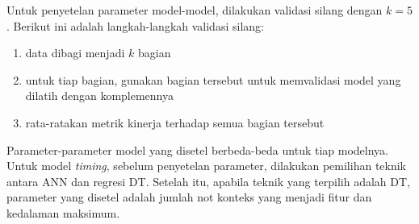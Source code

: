 Untuk penyetelan parameter model-model, dilakukan validasi silang dengan $k=5$. Berikut ini adalah langkah-langkah validasi silang:
\begin{enumerate}
	\item data dibagi menjadi $k$ bagian
	\item untuk tiap bagian, gunakan bagian tersebut untuk memvalidasi model yang dilatih dengan komplemennya
	\item rata-ratakan metrik kinerja terhadap semua bagian tersebut
\end{enumerate}

Parameter-parameter model yang disetel berbeda-beda untuk tiap modelnya. Untuk model \textit{timing}, sebelum penyetelan parameter, dilakukan pemilihan teknik antara ANN dan regresi DT. Setelah itu, apabila teknik yang terpilih adalah DT, parameter yang disetel adalah jumlah not konteks yang menjadi fitur dan kedalaman maksimum.


